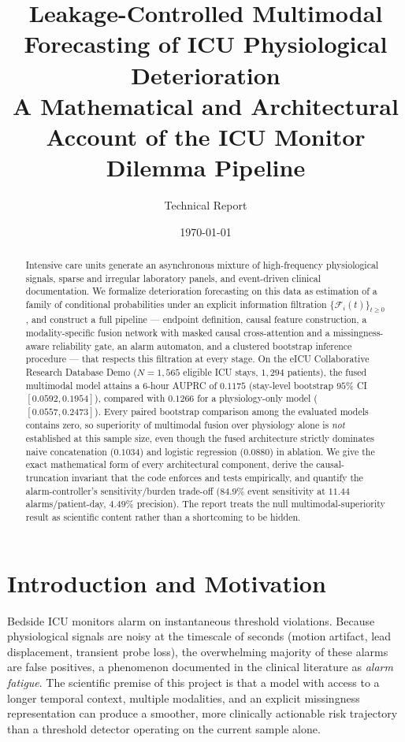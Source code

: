 \documentclass[11pt]{article}
\title{\textbf{Leakage-Controlled Multimodal Forecasting of ICU Physiological Deterioration}\\[4pt]
\large A Mathematical and Architectural Account of the ICU Monitor Dilemma Pipeline}
\author{Technical Report}
\date{\today}
\newcommand{\F}{\mathcal{F}}
\newcommand{\1}[1]{\mathbf{1}\!\left[#1\right]}
\begin{document}
\maketitle

\begin{abstract}
\noindent
Intensive care units generate an asynchronous mixture of high-frequency physiological signals, sparse and irregular laboratory panels, and event-driven clinical documentation. We formalize deterioration forecasting on this data as estimation of a family of conditional probabilities under an explicit information filtration $\{\F_i(t)\}_{t\geq0}$, and construct a full pipeline --- endpoint definition, causal feature construction, a modality-specific fusion network with masked causal cross-attention and a missingness-aware reliability gate, an alarm automaton, and a clustered bootstrap inference procedure --- that respects this filtration at every stage. On the eICU Collaborative Research Database Demo ($N=1{,}565$ eligible ICU stays, $1{,}294$ patients), the fused multimodal model attains a $6$-hour AUPRC of $0.1175$ (stay-level bootstrap $95\%$ CI $[0.0592,0.1954]$), compared with $0.1266$ for a physiology-only model ($[0.0557,0.2473]$). Every paired bootstrap comparison among the evaluated models contains zero, so superiority of multimodal fusion over physiology alone is \emph{not} established at this sample size, even though the fused architecture strictly dominates naive concatenation ($0.1034$) and logistic regression ($0.0880$) in ablation. We give the exact mathematical form of every architectural component, derive the causal-truncation invariant that the code enforces and tests empirically, and quantify the alarm-controller's sensitivity/burden trade-off ($84.9\%$ event sensitivity at $11.44$ alarms/patient-day, $4.49\%$ precision). The report treats the null multimodal-superiority result as scientific content rather than a shortcoming to be hidden.
\end{abstract}

\tableofcontents

\section{Introduction and Motivation}

Bedside ICU monitors alarm on instantaneous threshold violations. Because physiological signals are noisy at the timescale of seconds (motion artifact, lead displacement, transient probe loss), the overwhelming majority of these alarms are false positives, a phenomenon documented in the clinical literature as \emph{alarm fatigue}. The scientific premise of this project is that a model with access to a longer temporal context, multiple modalities, and an explicit missingness representation can produce a smoother, more clinically actionable risk trajectory than a threshold detector operating on the current sample alone.
\end{document}
